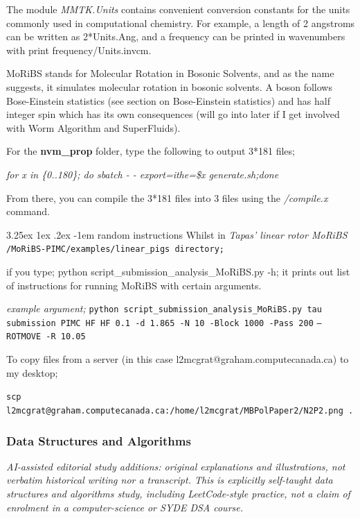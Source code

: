 \documentclass{article}
\makeatletter
\newcounter{subsubsubsection}[subsubsection]
\renewcommand\subparagraph{\@startsection{subparagraph}{6}{\parindent}%
  {3.25ex \@plus1ex \@minus .2ex}%
  {-1em}%
  {\normalfont\normalsize\bfseries}}
\makeatother
\begin{document}
The module \textit{MMTK.Units} contains convenient conversion
constants for the units commonly used in computational chemistry.  For
example, a length of 2 angstroms can be written as 2*Units.Ang, and a
frequency can be printed in wavenumbers with print frequency/Units.invcm. 

MoRiBS stands for Molecular Rotation in Bosonic Solvents, and as the name suggests, it simulates molecular rotation in bosonic solvents. A boson follows Bose-Einstein statistics (see section on Bose-Einstein statistics) and has half integer spin which has its own consequences (will go into later if I get involved with Worm Algorithm and SuperFluids). 





For the \textbf{nvm\_prop} folder, type the following to output 3*181 files;

\textit{for x in \{0..180\}; do sbatch  - - export=ithe=\$x generate.sh;done}

From there, you can compile the 3*181 files into 3 files using the \textit{/compile.x} command.  

\subparagraph{random instructions}
Whilst in \textit{Tapas' linear rotor MoRiBS} \texttt{/MoRiBS-PIMC/examples/linear\_pigs directory;} 

if you type; python script\_submission\_analysis\_MoRiBS.py -h;  
it prints out list of instructions for running MoRiBS with certain arguments.

\textit{example argument;}  \texttt{python script\_submission\_analysis\_MoRiBS.py tau submission PIMC HF HF 0.1 -d 1.865 -N 10 -Block 1000 -Pass 200}
\texttt{--ROTMOVE -R 10.05}

\vspace{0.5cm}

To copy files from a server (in this case l2mcgrat@graham.computecanada.ca) to my desktop;

\texttt{scp l2mcgrat@graham.computecanada.ca:/home/l2mcgrat/MBPolPaper2/N2P2.png .}

\subsubsection{Data Structures and Algorithms}\label{sec:data-structures-and-algorithms}

\label{study-computation}
\textit{AI-assisted editorial study additions: original explanations and illustrations, not verbatim historical writing nor a transcript. This is explicitly self-taught data structures and algorithms study, including LeetCode-style practice, not a claim of enrolment in a computer-science or SYDE DSA course.}
\end{document}
